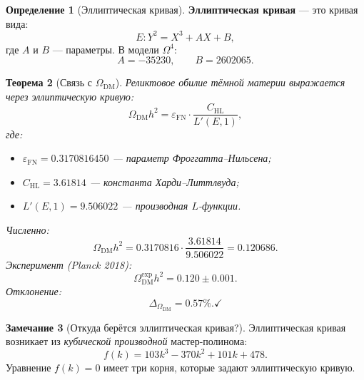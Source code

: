 \documentclass[11pt,a4paper]{article}
\newcommand{\Om}{\Omega^4}
\newcommand{\epsFN}{\varepsilon_{\text{FN}}}
\newtheorem{theorem}{Теорема}[section]
\theoremstyle{definition}
\newtheorem{definition}[theorem]{Определение}
\newtheorem{remark}[theorem]{Замечание}
\begin{document}
\begin{definition}[Эллиптическая кривая]
\label{def:elliptic-curve}
\textbf{Эллиптическая кривая} — это кривая вида:
\begin{equation}
    E: Y^2 = X^3 + AX + B,
\end{equation}
где $A$ и $B$ — параметры. В модели $\Om$:
\begin{equation}
    A = -35230, \qquad B = 2602065.
\end{equation}
\end{definition}

\begin{theorem}[Связь с $\Omega_{\text{DM}}$]
\label{thm:omega-dm-elliptic}
Реликтовое обилие тёмной материи выражается через 
эллиптическую кривую:
\begin{equation}
    \Omega_{\text{DM}} h^2 = \epsFN \cdot \frac{C_{\text{HL}}}{L'(E,1)},
\end{equation}
где:
\begin{itemize}
    \item $\epsFN = 0.3170816450$ — параметр Фроггатта--Нильсена;
    \item $C_{\text{HL}} = 3.61814$ — константа Харди--Литтлвуда;
    \item $L'(E,1) = 9.506022$ — производная $L$-функции.
\end{itemize}
Численно:
\begin{equation}
    \Omega_{\text{DM}} h^2 = 0.3170816 \cdot \frac{3.61814}{9.506022} 
    = 0.120686.
\end{equation}
Эксперимент (Planck 2018):
\begin{equation}
    \Omega_{\text{DM}}^{\text{exp}} h^2 = 0.120 \pm 0.001.
\end{equation}
Отклонение:
\begin{equation}
    \Delta_{\Omega_{\text{DM}}} = \mathbf{0.57\%}. \checkmark
\end{equation}
\end{theorem}

\begin{remark}[Откуда берётся эллиптическая кривая?]
\label{rem:elliptic-origin}
Эллиптическая кривая возникает из \emph{кубической 
производной} мастер-полинома:
\begin{equation}
    f(k) = 103k^3 - 370k^2 + 101k + 478.
\end{equation}
Уравнение $f(k) = 0$ имеет три корня, которые задают 
эллиптическую кривую.
\end{remark}
\end{document}
